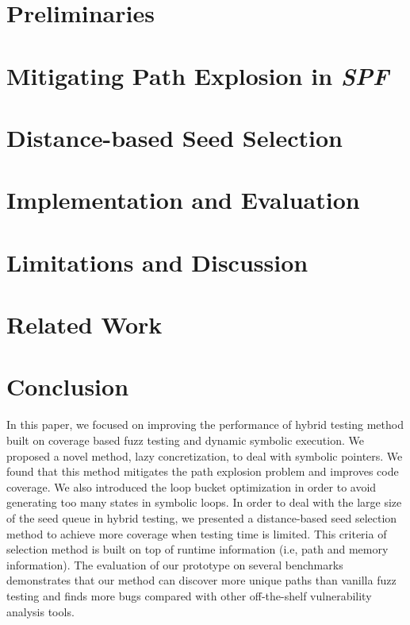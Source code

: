 \documentclass{cta-author}
\begin{document}
\section{Preliminaries} \label{sec:preliminaries}


\section{Mitigating Path Explosion in \textit{SPF}} \label{sec:ease PE}


\section{Distance-based Seed Selection} \label{sec:seed selection}


\section{Implementation and Evaluation} \label{sec:evaluate}




\section{Limitations and Discussion} \label{sec:discussion}


\section{Related Work} \label{sec:related}


\section{Conclusion} \label{sec:conclusion}
In this paper, we focused on improving the performance of hybrid 
testing method built on coverage based fuzz testing and dynamic 
symbolic execution. We proposed a novel method, lazy concretization, 
to deal with symbolic pointers. We found that this method mitigates 
the path explosion problem and improves code coverage. We also introduced 
the loop bucket optimization in order to avoid generating too many 
states in symbolic loops. In order to deal with the large size of 
the seed queue in hybrid testing, we presented a distance-based seed 
selection method to achieve more coverage when testing time is limited. 
This criteria of selection method is built on top of runtime information 
(i.e, path and memory information). The evaluation of our prototype 
on several benchmarks demonstrates that our method can discover more 
unique paths than vanilla fuzz testing and finds more bugs compared 
with other off-the-shelf vulnerability analysis tools.




\vfill\pagebreak
\end{document}
